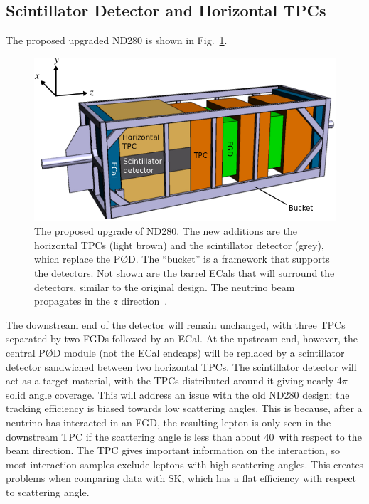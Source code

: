 \documentclass[aps,pra,12pt,notitlepage,tightenlines]{revtex4-1}
\begin{document}
\subsection{Scintillator Detector and Horizontal TPCs}
The proposed upgraded ND280 is shown in Fig.\ \ref{fig:up}.
\begin{figure}
 \includegraphics[scale=0.5]{upgrade2.png}
 \caption{The proposed upgrade of ND280. The new additions are the horizontal TPCs (light brown) and the scintillator detector (grey), which replace the P\O D. The ``bucket'' is a framework that supports the detectors. Not shown are the barrel ECals that will surround the detectors, similar to the original design. The neutrino beam propagates in the $z$ direction~\cite{Blondel:2299599}.}
 \label{fig:up}
\end{figure}
The downstream end of the detector will remain unchanged, with three TPCs separated by two FGDs followed by an ECal. At the upstream end, however, the central P\O D module (not the ECal endcaps) will be replaced by a scintillator detector sandwiched between two horizontal TPCs. The scintillator detector will act as a target material, with the TPCs distributed around it giving nearly 4$\pi$ solid angle coverage. This  will address an issue with the old ND280 design: the tracking efficiency is biased towards low scattering angles. This is because, after a neutrino has interacted in an FGD, the resulting lepton is only seen in the downstream TPC if the scattering angle is less than about 40\degree\ with respect to the beam direction. The TPC gives important information on the interaction, so most interaction samples exclude leptons with high scattering angles. This creates problems when comparing data with SK, which has a flat efficiency with respect to scattering angle.
\end{document}
